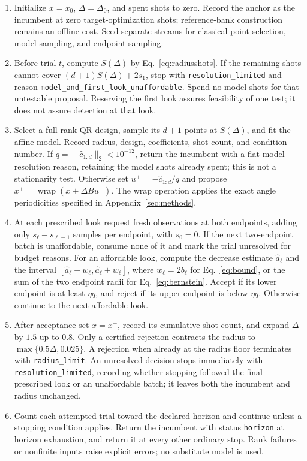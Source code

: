 \documentclass[11pt]{article}
\newcommand{\norm}[1]{\lVert #1\rVert}
\begin{document}
\begin{enumerate}
\item Initialize $x=x_0$, $\Delta=\Delta_0$, and spent shots to zero.
Record the anchor as the incumbent at zero target-optimization shots;
reference-bank construction remains an offline cost. Seed separate streams for
classical point selection, model sampling, and endpoint sampling.
\item Before trial $t$, compute $S(\Delta)$ by Eq.~\eqref{eq:radiusshots}.
If the remaining shots cannot cover $(d+1)S(\Delta)+2s_1$, stop with
\texttt{resolution\_limited} and reason
\texttt{model\_and\_first\_look\_unaffordable}. Spend no model shots for
that untestable proposal. Reserving the first look assures feasibility of
one test; it does not assure detection at that look.
\item Select a full-rank QR design, sample its $d+1$ points at $S(\Delta)$,
and fit the affine model. Record radius, design, coefficients, shot count,
and condition number. If $q=\norm{\widehat c_{1:d}}_2<10^{-12}$, return
the incumbent with a flat-model resolution reason, retaining the model
shots already spent; this is not a stationarity test. Otherwise set
$u^+=-\widehat c_{1:d}/q$ and propose
$x^+=\operatorname{wrap}(x+\Delta Bu^+)$. The wrap operation applies
the exact angle periodicities specified in Appendix~\ref{sec:methods}.
\item At each prescribed look request fresh observations at both endpoints,
adding only $s_\ell-s_{\ell-1}$ samples per endpoint, with $s_0=0$.
If the next two-endpoint batch is unaffordable, consume none of it and mark
the trial unresolved for budget reasons. For an affordable look, compute
the decrease estimate $\widehat a_\ell$ and the interval
$[\widehat a_\ell-w_\ell,\widehat a_\ell+w_\ell]$, where
$w_\ell=2b_\ell$ for Eq.~\eqref{eq:bound}, or the sum of the two
endpoint radii for Eq.~\eqref{eq:bernstein}. Accept if its lower
endpoint is at least $\eta q$, and reject if its upper endpoint is below
$\eta q$. Otherwise continue to the next affordable look.
\item After acceptance set $x=x^+$, record its cumulative shot count, and
expand $\Delta$ by $1.5$ up to $0.8$. Only a certified rejection contracts the radius
to $\max\{0.5\Delta,0.025\}$. A rejection when already at the
radius floor terminates with
\texttt{radius\_limit}. An unresolved decision stops immediately with
\texttt{resolution\_limited}, recording whether stopping followed the final
prescribed look or an unaffordable batch; it leaves both the incumbent and radius
unchanged.
\item Count each attempted trial toward the declared horizon and continue unless
a stopping condition applies. Return the incumbent with status
\texttt{horizon} at horizon exhaustion, and return it at every other ordinary
stop. Rank failures or nonfinite inputs raise explicit errors; no substitute
model is used.
\end{enumerate}
\end{document}
